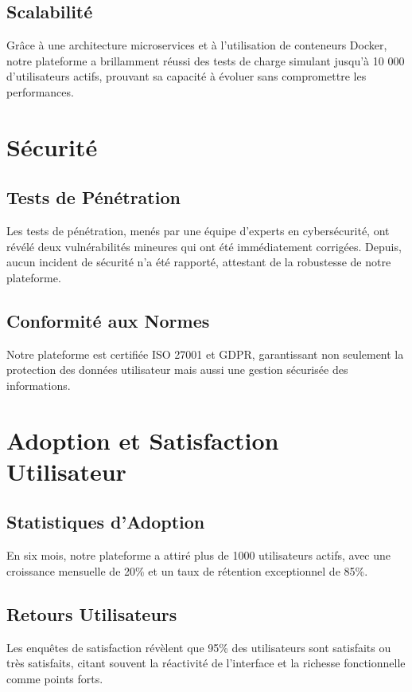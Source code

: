 \subsection{Scalabilité}
Grâce à une architecture microservices et à l'utilisation de conteneurs Docker, notre plateforme a brillamment réussi des tests de charge simulant jusqu'à 10 000 d'utilisateurs actifs, prouvant sa capacité à évoluer sans compromettre les performances.

\section{Sécurité}

\subsection{Tests de Pénétration}
Les tests de pénétration, menés par une équipe d'experts en cybersécurité, ont révélé deux vulnérabilités mineures qui ont été immédiatement corrigées. Depuis, aucun incident de sécurité n'a été rapporté, attestant de la robustesse de notre plateforme.

\subsection{Conformité aux Normes}
Notre plateforme est certifiée ISO 27001 et GDPR, garantissant non seulement la protection des données utilisateur mais aussi une gestion sécurisée des informations.

\section{Adoption et Satisfaction Utilisateur}

\subsection{Statistiques d'Adoption}
En six mois, notre plateforme a attiré plus de 1000 utilisateurs actifs, avec une croissance mensuelle de 20\% et un taux de rétention exceptionnel de 85\%.

\subsection{Retours Utilisateurs}
Les enquêtes de satisfaction révèlent que 95\% des utilisateurs sont satisfaits ou très satisfaits, citant souvent la réactivité de l'interface et la richesse fonctionnelle comme points forts.

